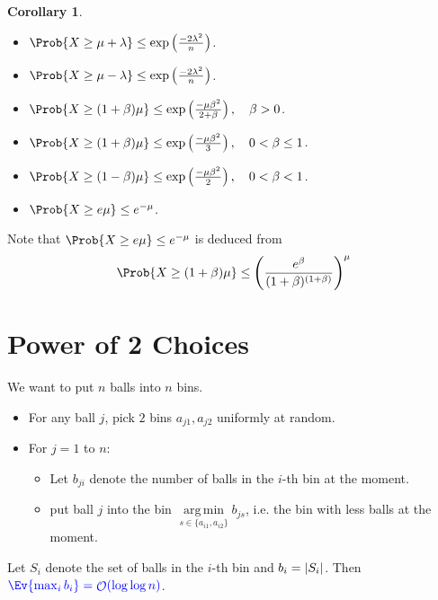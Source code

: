 \documentclass[a4paper]{article}
\DeclarePairedDelimiter{\abs}{\lvert}{\rvert}
\DeclareMathOperator*{\argmin}{arg\,min}
\DeclareMathOperator{\Ord}{\mathcal{O}}
\theoremstyle{mystyle}
\newtheorem{coro}{Corollary}
\begin{document}
\begin{coro} \mbox{}
  \begin{itemize}
    \item $\Prob{X \ge \mu + \lambda} \le \exp\left(\frac{-2\lambda^2}{n}\right)$.
    \item $\Prob{X \ge \mu - \lambda} \le \exp\left(\frac{-2\lambda^2}{n}\right)$.
    \item $\Prob{X \ge (1+\beta)\mu} \le \exp\left(\frac{-\mu\beta^2}{2+\beta}\right),
      \quad \beta > 0$.
    \item $\Prob{X \ge (1+\beta)\mu} \le \exp\left(\frac{-\mu\beta^2}{3}\right),
      \quad 0 < \beta \le 1$.
    \item $\Prob{X \ge (1-\beta)\mu} \le \exp\left(\frac{-\mu\beta^2}{2}\right),
      \quad 0 < \beta < 1$.
    \item $\Prob{X \ge e\mu} \le e^{-\mu}$.
  \end{itemize}
\end{coro}

\begin{mdframed}
  Note that $\Prob{X \ge e\mu} \le e^{-\mu}$ is deduced from
  \[
    \Prob{X \ge (1+\beta)\mu} \le \left(\frac{e^\beta}{(1+\beta)^{(1+\beta)}}\right)^\mu
  \]
\end{mdframed}

\newpage

\section{Power of 2 Choices}
We want to put $n$ balls into $n$ bins.
\begin{itemize}
  \item For any ball $j$, pick $2$ bins $a_{j1}, a_{j2}$ uniformly at random.
  \item For $j = 1$ to $n$:
    \begin{itemize}
      \item Let $b_{ji}$ denote the number of balls in the $i$-th bin
        at the moment.
      \item put ball $j$ into the bin $\argmin\limits_{s \in \{ a_{i1}, a_{i2} \}} b_{js}$,
        i.e. the bin with less balls at the moment.
    \end{itemize}
\end{itemize}
Let $S_i$ denote the set of balls in the $i$-th bin and $b_i = \abs{S_i}$.
Then ${\color{blue} \Ev{ \max_i b_i } = \Ord(\log \log n)}$.
\end{document}
